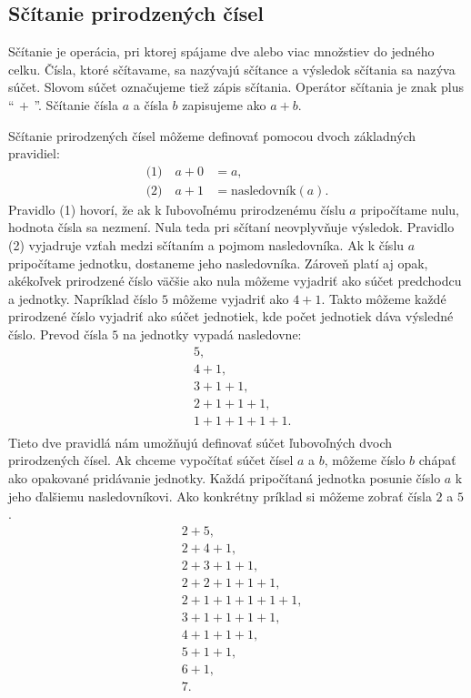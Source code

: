 \documentclass{article}
\begin{document}
\subsection{Sčítanie prirodzených čísel}

Sčítanie je operácia, pri ktorej spájame dve alebo viac množstiev do jedného celku. Čísla, ktoré sčítavame, sa nazývajú sčítance a výsledok sčítania sa nazýva súčet. Slovom súčet označujeme tiež zápis sčítania. Operátor sčítania je znak plus \enquote{\(\, + \,\)}. Sčítanie čísla \(a\) a čísla \(b\) zapisujeme ako \(a + b\).

Sčítanie prirodzených čísel môžeme definovať pomocou dvoch základných pravidiel:
\[
\begin{aligned}
  \text{(1)}\quad a + 0 &= a, \\
  \text{(2)}\quad a + 1 &= \text{nasledovník}(a).
\end{aligned}
\]
Pravidlo (1) hovorí, že ak k ľubovoľnému prirodzenému číslu \(a\) pripočítame nulu, hodnota čísla sa nezmení. Nula teda pri sčítaní neovplyvňuje výsledok. Pravidlo (2) vyjadruje vzťah medzi sčítaním a pojmom nasledovníka. Ak k číslu \(a\) pripočítame jednotku, dostaneme jeho nasledovníka. Zároveň platí aj opak, akékoľvek prirodzené číslo väčšie ako nula môžeme vyjadriť ako súčet predchodcu a jednotky. Napríklad číslo \(5\) môžeme vyjadriť ako \(4 + 1\). Takto môžeme každé prirodzené číslo vyjadriť ako súčet jednotiek, kde počet jednotiek dáva výsledné číslo. Prevod čísla \(5\) na jednotky vypadá nasledovne:
\[
\begin{aligned}
  &5, \\
  &4 + 1, \\
  &3 + 1 + 1, \\
  &2 + 1 + 1 + 1, \\
  &1 + 1 + 1 + 1 + 1. \\
\end{aligned}
\]
Tieto dve pravidlá nám umožňujú definovať súčet ľubovoľných dvoch prirodzených čísel. Ak chceme vypočítať súčet čísel \(a\) a \(b\), môžeme číslo \(b\) chápať ako opakované pridávanie jednotky. Každá pripočítaná jednotka posunie číslo \(a\) k jeho ďalšiemu nasledovníkovi. Ako konkrétny príklad si môžeme zobrať čísla \(2\) a \(5\).
\[
\begin{aligned}
  &2 + 5, \\
  &2 + 4 + 1, \\
  &2 + 3 + 1 + 1, \\
  &2 + 2 + 1 + 1 + 1, \\
  &2 + 1 + 1 + 1 + 1 + 1, \\
  &3 + 1 + 1 + 1 + 1, \\
  &4 + 1 + 1 + 1, \\
  &5 + 1 + 1, \\
  &6 + 1, \\
  &7.
\end{aligned}
\]
\end{document}
